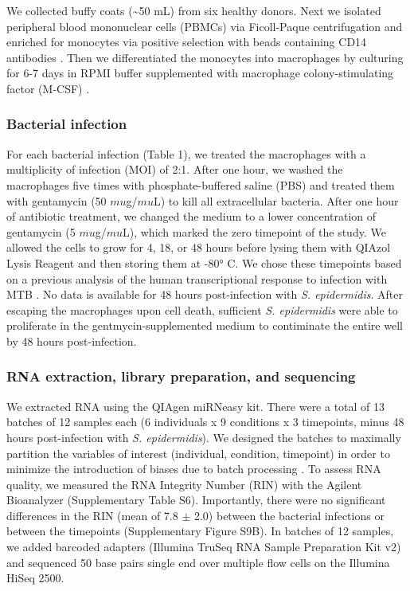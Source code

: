 We collected buffy coats (\textasciitilde{}50 mL) from six healthy
donors. Next we isolated peripheral blood mononuclear cells (PBMCs) via
Ficoll-Paque centrifugation \citep{Rivero-Lezcano2012} and enriched for
monocytes via positive selection with beads containing CD14 antibodies
\citep{Barreiro2012}. Then we differentiated the monocytes into
macrophages by culturing for 6-7 days in RPMI buffer supplemented with
macrophage colony-stimulating factor (M-CSF) \citep{Tailleux2003}.

\subsubsection{Bacterial infection}\label{bacterial-infection}

For each bacterial infection (Table 1), we treated the macrophages with
a multiplicity of infection (MOI) of 2:1. After one hour, we washed the
macrophages five times with phosphate-buffered saline (PBS) and treated
them with gentamycin (50 $mu$g/$mu$L) to kill all extracellular bacteria.
After one hour of antibiotic treatment, we changed the medium to a lower
concentration of gentamycin (5 $mu$g/$mu$L), which marked the zero timepoint
of the study. We allowed the cells to grow for 4, 18, or 48 hours before
lysing them with QIAzol Lysis Reagent and then storing them at -80° C.
We chose these timepoints based on a previous analysis of the human
transcriptional response to infection with MTB \citep{Tailleux2008}. No
data is available for 48 hours post-infection with \emph{S.
epidermidis}. After escaping the macrophages upon cell death, sufficient
\emph{S. epidermidis} were able to proliferate in the
gentmycin-supplemented medium to contiminate the entire well by 48 hours
post-infection.

\subsubsection{RNA extraction, library preparation, and
sequencing}\label{rna-extraction-library-preparation-and-sequencing}

We extracted RNA using the QIAgen miRNeasy kit. There were a total of 13
batches of 12 samples each (6 individuals x 9 conditions x 3 timepoints,
minus 48 hours post-infection with \emph{S. epidermidis}). We designed
the batches to maximally partition the variables of interest
(individual, condition, timepoint) in order to minimize the introduction
of biases due to batch processing \citep{Auer2010}. To assess RNA
quality, we measured the RNA Integrity Number (RIN) with the Agilent
Bioanalyzer (Supplementary Table S6). Importantly, there were no
significant differences in the RIN (mean of 7.8 $\pm$ 2.0) between the
bacterial infections or between the timepoints (Supplementary Figure
S9B). In batches of 12 samples, we added barcoded adapters (Illumina
TruSeq RNA Sample Preparation Kit v2) and sequenced 50 base pairs single
end over multiple flow cells on the Illumina HiSeq 2500.

